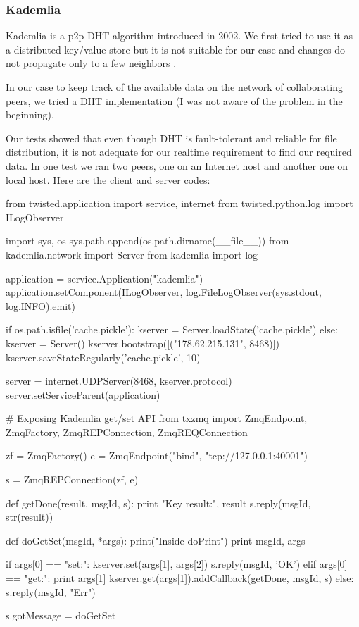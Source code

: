 \subsubsection{Kademlia}
Kademlia is a p2p DHT algorithm introduced in 2002. We first tried to use it as a distributed key/value store but 
it is not suitable for our case and changes do not propagate only to a few neighbors \cite{KademliaPaper}.

In our case to keep track of the available data on the network of collaborating peers, we tried a DHT implementation 
(I was not aware of the problem in the beginning).

Our tests showed that even though DHT is fault-tolerant and reliable for file distribution,
it is not adequate for our realtime requirement to find our required data. In one test we ran two peers,
one on an Internet host and another one on local host. Here are the client and server codes:

\begin{python}
from twisted.application import service, internet
from twisted.python.log import ILogObserver

import sys, os
sys.path.append(os.path.dirname(__file__))
from kademlia.network import Server
from kademlia import log

application = service.Application("kademlia")
application.setComponent(ILogObserver, 
	log.FileLogObserver(sys.stdout, log.INFO).emit)

if os.path.isfile('cache.pickle'):
    kserver = Server.loadState('cache.pickle')
else:
    kserver = Server()
    kserver.bootstrap([("178.62.215.131", 8468)])
kserver.saveStateRegularly('cache.pickle', 10)

server = internet.UDPServer(8468, kserver.protocol)
server.setServiceParent(application)


# Exposing Kademlia get/set API
from txzmq import ZmqEndpoint, ZmqFactory, ZmqREPConnection,
 ZmqREQConnection

zf = ZmqFactory()
e = ZmqEndpoint("bind", "tcp://127.0.0.1:40001")

s = ZmqREPConnection(zf, e)

def getDone(result, msgId, s):
    print "Key result:", result
    s.reply(msgId, str(result))

def doGetSet(msgId, *args):
    print("Inside doPrint")
    print msgId, args

    if args[0] == "set:":
        kserver.set(args[1], args[2])
        s.reply(msgId, 'OK')
    elif args[0] == "get:":
        print args[1]
        kserver.get(args[1]).addCallback(getDone, msgId, s)
    else:
        s.reply(msgId, "Err")

s.gotMessage = doGetSet
\end{python}

